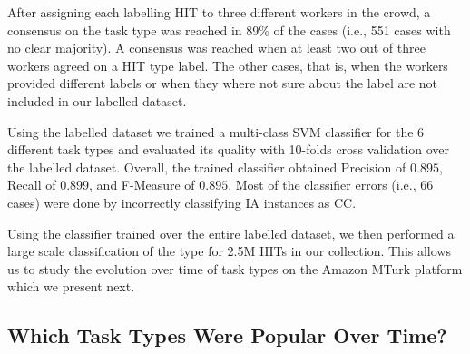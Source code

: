 After assigning each labelling HIT to three different workers in the crowd, a consensus on the task type was reached in 89\% of the cases (i.e., 551 cases with no clear majority). A consensus was reached when at least two out of three workers agreed on a HIT type label. The other cases, that is, when the workers provided different labels or when they where not sure about the label are not included in our labelled dataset.

Using the labelled dataset we trained a multi-class SVM classifier for the 6 different task types and evaluated its quality with 10-folds cross validation over the labelled dataset. Overall, the trained classifier obtained Precision of $0.895$, Recall of $0.899$, and F-Measure of $0.895$. Most of the classifier errors (i.e., 66 cases) were done by incorrectly classifying IA instances as CC.

Using the classifier trained over the entire labelled dataset, we then performed a large scale classification of the type for 2.5M HITs in our collection. This allows us to study the evolution over time of task types on the Amazon MTurk platform which we present next.

\subsection{Which Task Types Were Popular Over Time?}


